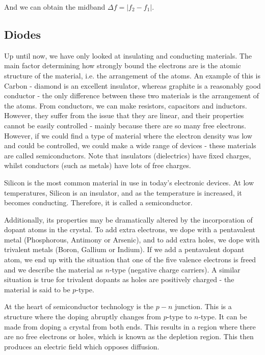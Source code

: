 \documentclass{article}
\begin{document}
And we can obtain the midband $\Delta f = |f_2 - f_1|.$

\newpage

\subsection{Diodes}

Up until now, we have only looked at insulating and conducting materials. The main factor determining how strongly bound the electrons are is the atomic structure of the material, i.e. the arrangement of the atoms. An example of this is Carbon - diamond is an excellent insulator, whereas graphite is a reasonably good conductor - the only difference between these two materials is the arrangement of the atoms. From conductors, we can make resistors, capacitors and inductors. However, they suffer from the issue that they are linear, and their properties cannot be easily controlled - mainly because there are so many free electrons. However, if we could find a type of material where the electron density was low and could be controlled, we could make a wide range of devices - these materials are called semiconductors. Note that insulators (dielectrics) have fixed charges, whilst conductors (such as metals) have lots of free charges.

Silicon is the most common material in use in today's electronic devices. At low temperatures, Silicon is an insulator, and as the temperature is increased, it becomes conducting. Therefore, it is called a semiconductor. 

Additionally, its properties may be dramatically altered by the incorporation of dopant atoms in the crystal. To add extra electrons, we dope with a pentavalent metal (Phosphorous, Antimony or Arsenic), and to add extra holes, we dope with trivalent metals (Boron, Gallium or Indium). If we add a pentavalent dopant atom, we end up with the situation that one of the five valence electrons is freed and we describe the material as $n$-type (negative charge carriers). A similar situation is true for trivalent dopants as holes are positively charged - the material is said to be $p$-type.

At the heart of semiconductor technology is the $p-n$ junction. This is a structure where the doping abruptly changes from $p$-type to $n$-type. It can be made from doping a crystal from both ends. This results in a region where there are no free electrons or holes, which is known as the depletion region. This then produces an electric field which opposes diffusion.
\end{document}

